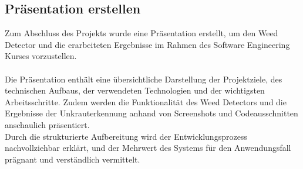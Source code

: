 \documentclass[12pt]{scrartcl}
\begin{document}
\subsection{Präsentation erstellen}
Zum Abschluss des Projekts wurde eine Präsentation erstellt, um den Weed Detector und die erarbeiteten Ergebnisse im Rahmen des Software Engineering Kurses vorzustellen.\\
\\
Die Präsentation enthält eine übersichtliche Darstellung der Projektziele, des technischen Aufbaus, der verwendeten Technologien und der wichtigsten Arbeitsschritte. Zudem werden die Funktionalität des Weed Detectors und die Ergebnisse der Unkrauterkennung anhand von Screenshots und Codeausschnitten anschaulich präsentiert.
\\
Durch die strukturierte Aufbereitung wird der Entwicklungsprozess nachvollziehbar erklärt, und der Mehrwert des Systems für den Anwendungsfall prägnant und verständlich vermittelt.
\end{document}
